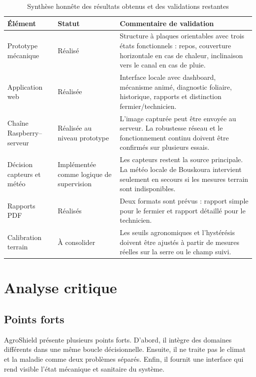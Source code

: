 ﻿\documentclass[11pt,a4paper,openany]{report}
\begin{document}
\begin{table}[H]
\centering
\renewcommand{\arraystretch}{1.25}
\begin{tabular}{|p{3.8cm}|p{3.1cm}|p{7.2cm}|}
\hline
\textbf{Élément} & \textbf{Statut} & \textbf{Commentaire de validation} \\
\hline
Prototype mécanique & Réalisé & Structure à plaques orientables avec trois états fonctionnels : repos, couverture horizontale en cas de chaleur, inclinaison vers le canal en cas de pluie. \\
\hline
Application web & Réalisée & Interface locale avec dashboard, mécanisme animé, diagnostic foliaire, historique, rapports et distinction fermier/technicien. \\
\hline
Chaîne Raspberry--serveur & Réalisée au niveau prototype & L'image capturée peut être envoyée au serveur. La robustesse réseau et le fonctionnement continu doivent être confirmés sur plusieurs essais. \\
\hline
Décision capteurs et météo & Implémentée comme logique de supervision & Les capteurs restent la source principale. La météo locale de Bouskoura intervient seulement en secours si les mesures terrain sont indisponibles. \\
\hline
Rapports PDF & Réalisés & Deux formats sont prévus : rapport simple pour le fermier et rapport détaillé pour le technicien. \\

\hline
Calibration terrain & À consolider & Les seuils agronomiques et l'hystérésis doivent être ajustés à partir de mesures réelles sur la serre ou le champ suivi. \\
\hline
\end{tabular}
\caption{Synthèse honnête des résultats obtenus et des validations restantes}
\label{tab:resultats_obtenus}
\end{table}

\chapter{Analyse critique}
\section{Points forts}
AgroShield présente plusieurs points forts. D'abord, il intègre des domaines différents dans une même boucle décisionnelle. Ensuite, il ne traite pas le climat et la maladie comme deux problèmes séparés. Enfin, il fournit une interface qui rend visible l'état mécanique et sanitaire du système.
\end{document}
